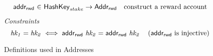 \begin{figure*}[hbt]
  \begin{equation*}
    \begin{array}{r@{~\in~}lr}
      \fun{addr_{rwd}}
        & \HashKey_{stake} \to \AddrRWD
        & \text{construct a reward account}
    \end{array}
  \end{equation*}
  \emph{Constraints}
  \begin{equation*}
    \mathit{hk_1} = \mathit{hk_2} \iff \mathsf{addr_{rwd}}~\mathit{hk_2} = \mathsf{addr_{rwd}}~\mathit{hk_2}
    ~~~ \left( \mathsf{addr_{rwd}} \text{ is injective} \right)
  \end{equation*}
  \caption{Definitions used in Addresses}
  \label{fig:defs:addresses}
\end{figure*}

\clearpage
